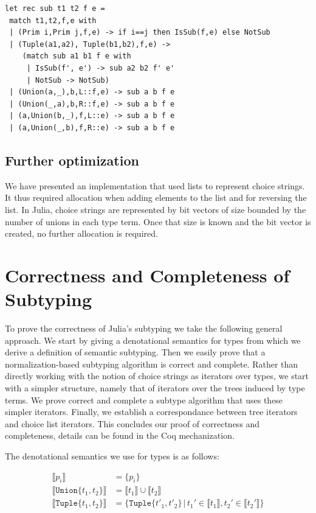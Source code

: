 \documentclass[a4paper,english]{lipics-v2019}
\newcommand{\xt}[1]{\texttt{#1}}
\newcommand{\tuplet}[2]{\xt{Tuple\{}#1,#2\xt{\}}}
\newcommand{\union}[2]{\xt{Union\{}#1,#2\xt{\}}}
\newcommand{\denotes}[1]{\llbracket #1 \rrbracket}
\begin{document}
\begin{lstlisting}
let rec sub t1 t2 f e =
 match t1,t2,f,e with 
 | (Prim i,Prim j,f,e) -> if i==j then IsSub(f,e) else NotSub
 | (Tuple(a1,a2), Tuple(b1,b2),f,e) ->
    (match sub a1 b1 f e with
     | IsSub(f', e') -> sub a2 b2 f' e'
     | NotSub -> NotSub)
 | (Union(a,_),b,L::f,e) -> sub a b f e
 | (Union(_,a),b,R::f,e) -> sub a b f e
 | (a,Union(b,_),f,L::e) -> sub a b f e
 | (a,Union(_,b),f,R::e) -> sub a b f e
\end{lstlisting}

\subsection{Further optimization}

We have presented an implementation that used lists to represent choice
strings. It thus required allocation when adding elements to the list and
for reversing the list. In Julia, choice strings are represented by bit
vectors of size bounded by the number of unions in each type term.  Once
that size is known and the bit vector is created, no further allocation is
required.
\newpage

\section{Correctness and Completeness of Subtyping}

To prove the correctness of Julia's subtyping we take the following general
approach. We start by giving a denotational semantics for types from which
we derive a definition of semantic subtyping. Then we easily prove that a
normalization-based subtyping algorithm is correct and complete. Rather than
directly working with the notion of choice strings as iterators over types,
we start with a simpler structure, namely that of iterators over the trees
induced by type terms. We prove correct and complete a subtype algorithm
that uses these simpler iterators. Finally, we establish a correspondance
between tree iterators and choice list iterators. This concludes our proof
of correctness and completeness, details can be found in the Coq
mechanization.

The denotational semantics we use for types is as follows:

\vspace{-5mm}
\begin{align*}
\denotes{p_i} &= \{p_i\} \\
\denotes{\union{t_1}{t_2}} &= \denotes{t_1} \cup \denotes{t_2} \\
\denotes{\tuplet{t_1}{t_2}} &= \{\tuplet{t'_1}{t'_2} \,|\, t_1' \in \denotes{t_1},  t_2' \in \denotes{t_2'}\}
\end{align*}
\vspace{-5mm}
\end{document}
